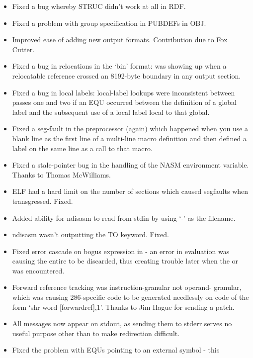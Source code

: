\begin{itemize}
    \item{Fixed a bug whereby STRUC didn't work at all in RDF.}
    \item{Fixed a problem with group specification in PUBDEFs in OBJ.}
    \item{Improved ease of adding new output formats. Contribution due to Fox Cutter.}
    \item{Fixed a bug in relocations in the `bin' format: was showing up when
        a relocatable reference crossed an 8192-byte boundary in any output
        section.}
    \item{Fixed a bug in local labels: local-label lookups were inconsistent
        between passes one and two if an EQU occurred between the definition
        of a global label and the subsequent use of a local label local to
        that global.}
    \item{Fixed a seg-fault in the preprocessor (again) which happened when
        you use a blank line as the first line of a multi-line macro
        definition and then defined a label on the same line as a call to
        that macro.}
    \item{Fixed a stale-pointer bug in the handling of the NASM environment
        variable. Thanks to Thomas McWilliams.}
    \item{ELF had a hard limit on the number of sections which caused
        segfaults when transgressed. Fixed.}
    \item{Added ability for ndisasm to read from stdin by using `-' as the
        filename.}
    \item{ndisasm wasn't outputting the TO keyword. Fixed.}
    \item{Fixed error cascade on bogus expression in  - an error in
        evaluation was causing the entire  to be discarded, thus creating
        trouble later when the  or  was encountered.}
    \item{Forward reference tracking was instruction-granular not operand-
        granular, which was causing 286-specific code to be generated
        needlessly on code of the form `shr word [forwardref],1'. Thanks to
        Jim Hague for sending a patch.}
    \item{All messages now appear on stdout, as sending them to stderr serves
        no useful purpose other than to make redirection difficult.}
    \item{Fixed the problem with EQUs pointing to an external symbol - this
}
\end{itemize}
